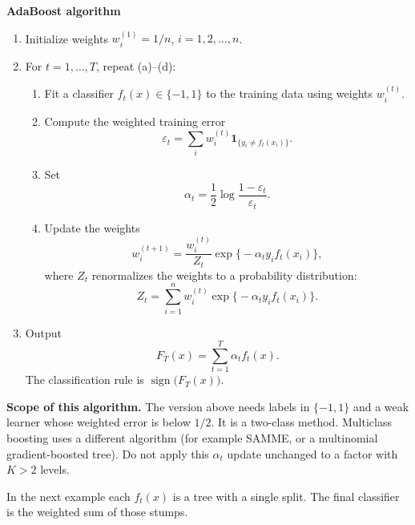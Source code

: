 \documentclass[
]{book}
\begin{document}
\textbf{AdaBoost algorithm}

\begin{enumerate}
\def\labelenumi{\arabic{enumi}.}
\item
  Initialize weights \(w_i^{(1)} = 1/n\), \(i=1,2,\ldots,n\).
\item
  For \(t=1,\ldots,T\), repeat (a)--(d):

  \begin{enumerate}
  \def\labelenumii{(\alph{enumii})}
  \item
    Fit a classifier \(f_t(x) \in \{-1,1\}\) to the training data using weights \(w_i^{(t)}\).
  \item
    Compute the weighted training error
    \[
    \varepsilon_t = \sum_i w_i^{(t)} \mathbf{1}_{\{y_i \neq f_t(x_i)\}}.
    \]
  \item
    Set
    \[
    \alpha_t = \frac12 \log \frac{1-\varepsilon_t}{\varepsilon_t}.
    \]
  \item
    Update the weights
    \[
    w_i^{(t+1)}
    =
    \frac{w_i^{(t)}}{Z_t}
    \exp\bigl\{-\alpha_t y_i f_t(x_i)\bigr\},
    \]
    where \(Z_t\) renormalizes the weights to a probability distribution:
    \[
    Z_t = \sum_{i=1}^{n} w_i^{(t)} \exp\bigl\{-\alpha_t y_i f_t(x_i)\bigr\}.
    \]
  \end{enumerate}
\item
  Output
  \[
  F_T(x) = \sum_{t=1}^{T} \alpha_t f_t(x).
  \]
  The classification rule is \(\operatorname{sign}\bigl(F_T(x)\bigr)\).
\end{enumerate}

\textbf{Scope of this algorithm.} The version above needs labels in \(\{-1,1\}\) and a weak learner whose weighted error is below \(1/2\). It is a two-class method. Multiclass boosting uses a different algorithm (for example SAMME, or a multinomial gradient-boosted tree). Do not apply this \(\alpha_t\) update unchanged to a factor with \(K>2\) levels.

\vspace{0.6em}

In the next example each \(f_t(x)\) is a tree with a single split. The final classifier is the weighted sum of those stumps.
\end{document}
